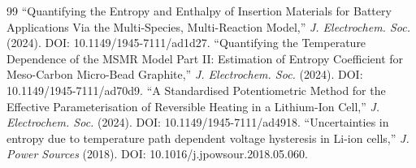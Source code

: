 \documentclass[11pt,a4paper]{article}
\begin{document}
\begin{thebibliography}{99}
 ``Quantifying the Entropy and Enthalpy of Insertion Materials for Battery Applications Via the Multi-Species, Multi-Reaction Model,'' \emph{J. Electrochem. Soc.} (2024). DOI: 10.1149/1945-7111/ad1d27.
 ``Quantifying the Temperature Dependence of the MSMR Model Part II: Estimation of Entropy Coefficient for Meso-Carbon Micro-Bead Graphite,'' \emph{J. Electrochem. Soc.} (2024). DOI: 10.1149/1945-7111/ad70d9.
 ``A Standardised Potentiometric Method for the Effective Parameterisation of Reversible Heating in a Lithium-Ion Cell,'' \emph{J. Electrochem. Soc.} (2024). DOI: 10.1149/1945-7111/ad4918.
 ``Uncertainties in entropy due to temperature path dependent voltage hysteresis in Li-ion cells,'' \emph{J. Power Sources} (2018). DOI: 10.1016/j.jpowsour.2018.05.060.
\end{thebibliography}
\end{document}

